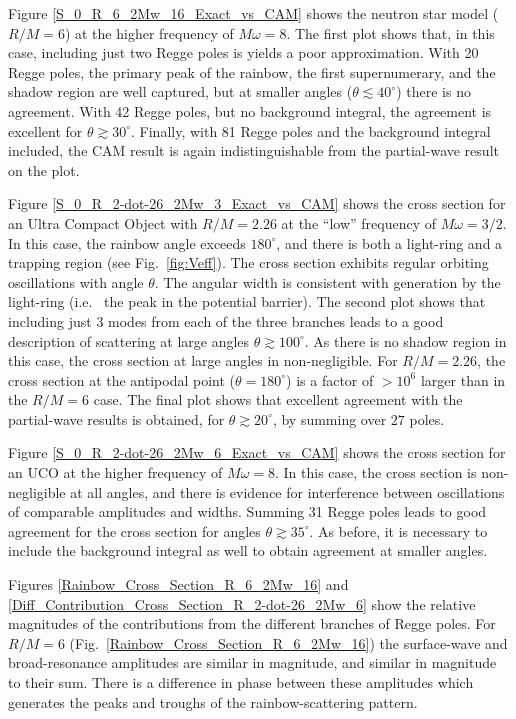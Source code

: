 \documentclass[aps,prd,longbibliography,reprint,twocolumn,amsmath,amssymb,amsfonts,showpacs,footnote,superscriptaddress]{revtex4-1}%
\begin{document}
Figure \ref{S_0_R_6_2Mw_16_Exact_vs_CAM} shows the neutron star model ($R/M = 6$) at the higher frequency of $M \omega = 8$. The first plot shows that, in this case, including just two Regge poles is yields a poor approximation. With 20 Regge poles, the primary peak of the rainbow, the first supernumerary, and the shadow region are well captured, but at smaller angles ($\theta  \lesssim 40^\circ$) there is no agreement. With 42 Regge poles, but no background integral, the agreement is excellent for $\theta \gtrsim 30^\circ$. Finally, with 81 Regge poles and the background integral included, the CAM result is again indistinguishable from the partial-wave result on the plot.

Figure \ref{S_0_R_2-dot-26_2Mw_3_Exact_vs_CAM} shows the cross section for an Ultra Compact Object with $R/M = 2.26$ at the ``low'' frequency of $M \omega = 3/2$. In this case, the rainbow angle exceeds $180^\circ$, and there is both a light-ring and a trapping region (see Fig.~\ref{fig:Veff}). The cross section exhibits regular orbiting oscillations with angle $\theta$. The angular width is consistent with generation by the light-ring (i.e.~ the peak in the potential barrier). The second plot shows that including just 3 modes from each of the three branches leads to a good description of scattering at large angles $\theta \gtrsim 100^\circ$. As there is no shadow region in this case, the cross section at large angles in non-negligible. For $R/M = 2.26$, the cross section at the antipodal point ($\theta = 180^\circ$) is a factor of $> 10^6$ larger than in the $R/M = 6$ case. The final plot shows that excellent agreement with the partial-wave results is obtained, for $\theta \gtrsim 20^\circ$, by summing over $27$ poles.

Figure \ref{S_0_R_2-dot-26_2Mw_6_Exact_vs_CAM} shows the cross section for an UCO at the higher frequency of $M \omega = 8$. In this case, the cross section is non-negligible at all angles, and there is evidence for interference between oscillations of comparable amplitudes and widths. Summing 31 Regge poles leads to good agreement for the cross section for angles $\theta \gtrsim 35^\circ$. As before, it is necessary to include the background integral as well to obtain agreement at smaller angles.

Figures \ref{Rainbow_Cross_Section_R_6_2Mw_16} and \ref{Diff_Contribution_Cross_Section_R_2-dot-26_2Mw_6} show the relative magnitudes of the contributions from the different branches of Regge poles. For $R/M = 6$ (Fig.~\ref{Rainbow_Cross_Section_R_6_2Mw_16}) the surface-wave and broad-resonance amplitudes are similar in magnitude, and similar in magnitude to their sum. There is a difference in phase between these amplitudes which generates the peaks and troughs of the rainbow-scattering pattern.
\end{document}
